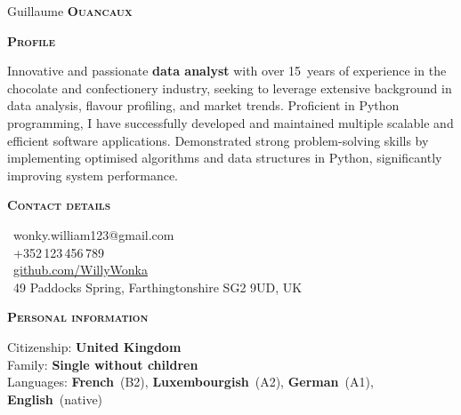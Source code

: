 \documentclass[11pt, a4paper]{article}
\newcommand{\headleft}[1]{\vspace*{3ex}\textsc{\textbf{#1}}\par%
    \vspace*{-1.5ex}\hrulefill\par\vspace*{0.7ex}}
\begin{document}
\setlength{\topskip}{0pt}
\setlength{\parindent}{0pt}
\setlength{\parskip}{0pt}
\setlength{\fboxsep}{0pt}
\pagestyle{empty}
\raggedbottom

\begin{minipage}[t]{0.33\textwidth} %
\colorbox{cvblue}{\begin{minipage}[t][5mm][t]{\textwidth}\null\hfill\null\end{minipage}}

\vspace{-.2ex} %
\colorbox{cvblue!90}{\color{white}  %
\textwidth\relax%
\begin{minipage}[t][293mm][t]{0.82\textwidth}
\raggedright
\vspace*{2.5ex}

\Large Guillaume \textbf{\textsc{Ouancaux}} \normalsize 


\vspace*{0.5ex} %

\headleft{Profile}
Innovative and passionate \textbf{data analyst} with over 15~years of experience in the chocolate and confectionery industry, seeking to leverage extensive background in data analysis, flavour profiling, and market trends.
Proficient in Python programming, I have successfully developed and maintained multiple scalable and efficient software applications.
Demonstrated strong problem-solving skills by implementing optimised algorithms and data structures in Python, significantly improving system performance.

\headleft{Contact details}
\small %
\MVAt\ {\small wonky.william123@gmail.com} \\[0.4ex]
\Mobilefone\ +352\,123\,456\,789 \\[0.5ex]
\Mundus\ \href{https://github.com/WillyWonka}{github.com/WillyWonka} \\[0.1ex]
\Letter\ 49 Paddocks Spring, Farthingtonshire SG2 9UD, UK
\normalsize

\headleft{Personal information}
Citizenship: \textbf{United Kingdom} \\[0.5ex]
Family: \textbf{Single without children} \\[0.5ex]
Languages: \textbf{French}~(B2), \textbf{Luxembourgish}~(A2), \textbf{German}~(A1), \textbf{English}~(native)


\end{minipage}}
\end{minipage}
\end{document}
